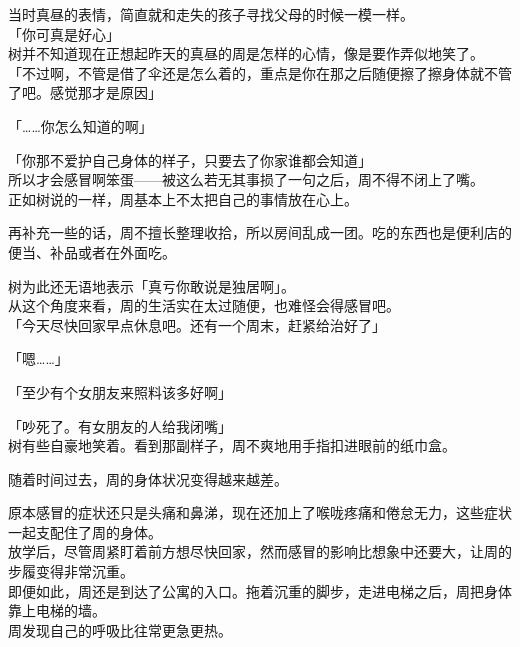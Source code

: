 当时真昼的表情，简直就和走失的孩子寻找父母的时候一模一样。\\

「你可真是好心」\\

树并不知道现在正想起昨天的真昼的周是怎样的心情，像是要作弄似地笑了。\\

「不过啊，不管是借了伞还是怎么着的，重点是你在那之后随便擦了擦身体就不管了吧。感觉那才是原因」

「……你怎么知道的啊」

「你那不爱护自己身体的样子，只要去了你家谁都会知道」\\

所以才会感冒啊笨蛋——被这么若无其事损了一句之后，周不得不闭上了嘴。\\

正如树说的一样，周基本上不太把自己的事情放在心上。

再补充一些的话，周不擅长整理收拾，所以房间乱成一团。吃的东西也是便利店的便当、补品或者在外面吃。

树为此还无语地表示「真亏你敢说是独居啊」。\\

从这个角度来看，周的生活实在太过随便，也难怪会得感冒吧。\\

「今天尽快回家早点休息吧。还有一个周末，赶紧给治好了」

「嗯……」

「至少有个女朋友来照料该多好啊」

「吵死了。有女朋友的人给我闭嘴」\\

树有些自豪地笑着。看到那副样子，周不爽地用手指扣进眼前的纸巾盒。\\

\vspace{2\baselineskip}

随着时间过去，周的身体状况变得越来越差。

原本感冒的症状还只是头痛和鼻涕，现在还加上了喉咙疼痛和倦怠无力，这些症状一起支配住了周的身体。\\

放学后，尽管周紧盯着前方想尽快回家，然而感冒的影响比想象中还要大，让周的步履变得非常沉重。\\

即便如此，周还是到达了公寓的入口。拖着沉重的脚步，走进电梯之后，周把身体靠上电梯的墙。\\

周发现自己的呼吸比往常更急更热。\\

